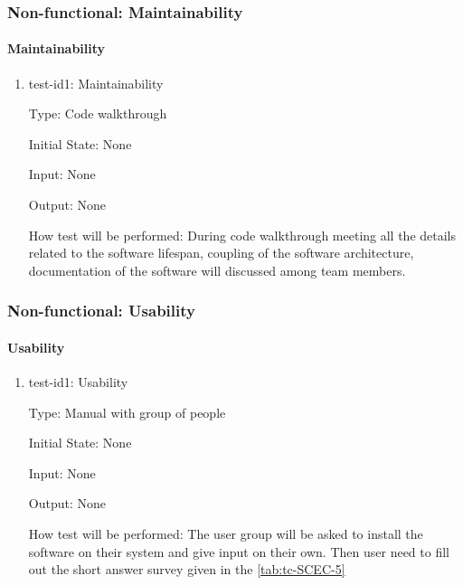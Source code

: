 \documentclass[12pt, titlepage]{article}
\begin{document}
\subsubsection{Non-functional: Maintainability}
\label{non_functional_maintainability}	
\paragraph{Maintainability}

\begin{enumerate}
					
\item{test-id1: Maintainability\\}

Type: Code walkthrough
					
Initial State: None 
					
Input: None 
					
Output: None
					
How test will be performed: During code walkthrough meeting all the details related to the software lifespan, coupling of the software architecture, documentation of the software will discussed among team members.

\end{enumerate}


\subsubsection{Non-functional: Usability}
\label{non_functional_usability}	
\paragraph{Usability}

\begin{enumerate}
					
\item{test-id1: Usability\\}

Type: Manual with group of people
					
Initial State: None 
					
Input: None 
					
Output: None
					
How test will be performed: The user group will be asked to install the software on their system and give input on their own. Then user need to fill out the short answer survey given in the \autoref{tab:tc-SCEC-5}

\end{enumerate}
\end{document}
